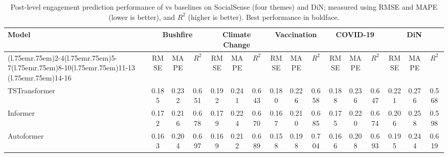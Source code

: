 
\begin{table*}[tb]
    \caption{
        Post-level engagement prediction performance of \icmamba vs baselines on SocialSense (four themes) and DiN; 
        measured using RMSE and MAPE (lower is better), and $R^2$ (higher is better).
        Best performance in boldface.
    }
    \centering
        \begin{adjustbox}{max width=1.0\linewidth}
            \begin{tabular}{lc@{\;\;}c@{\;\;}cc@{\;\;}c@{\;\;}cc@{\;\;}c@{\;\;}cc@{\;\;}c@{\;\;}cc@{\;\;}c@{\;\;}c}
                \toprule
                \toprule
                \multirow{2}{*}{Model}                    & \multicolumn{3}{c}{Bushfire} & \multicolumn{3}{c}{Climate Change} & \multicolumn{3}{c}{Vaccination} & \multicolumn{3}{c}{COVID-19} & \multicolumn{3}{c}{DiN}                                                                                                                                                                           \\
                \cmidrule(l{.75em}r{.75em}){2-4}\cmidrule(l{.75em}r{.75em}){5-7}\cmidrule(l{.75em}r{.75em}){8-10}\cmidrule(l{.75em}r{.75em}){11-13} \cmidrule(l{.75em}r{.75em}){14-16}
                                                          & RMSE                         & MAPE                               & $R^2$                           & RMSE                      & MAPE                    & $R^2$          & RMSE           & MAPE           & $R^2$          & RMSE           & MAPE           & $R^2$          & RMSE           & MAPE           & $R^2$          \\ \toprule
                TSTransformer~\cite{vaswani2017attention} & 0.185                        & 0.232                              & 0.651                           & 0.192                     & 0.241                   & 0.643          & 0.180          & 0.226          & 0.658          & 0.188          & 0.236          & 0.647          & 0.221          & 0.276          & 0.568          \\
                Informer~\cite{zhou2021informer}          & 0.172                        & 0.216                              & 0.678                           & 0.179                     & 0.224                   & 0.670          & 0.167          & 0.210          & 0.685          & 0.175          & 0.220          & 0.674          & 0.206          & 0.258          & 0.598          \\
                Autoformer~\cite{wu2021autoformer}        & 0.163                        & 0.204                              & 0.697                           & 0.169                     & 0.212                   & 0.689          & 0.158          & 0.198          & 0.704          & 0.166          & 0.208          & 0.693          & 0.195          & 0.244          & 0.619          \\


\end{tabular}
\end{adjustbox}
\end{table*}
